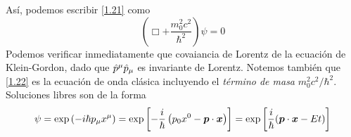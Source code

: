 Así, podemos escribir \eqref{1.21} como
\begin{equation}\label{1.22}
  \left(\Box+\frac{m_0^2c^2}{\hbar^2}\right)\psi=0
\end{equation}
Podemos verificar inmediatamente que covaiancia de Lorentz de la ecuación de Klein-Gordon, dado que $ \hat{p}^\mu \hat{p}_\mu$ es invariante de Lorentz. Notemos también que \eqref{1.22} es la ecuación de onda clásica incluyendo el \textit{término de masa} $m_0^2c^2/\hbar^2$. Soluciones libres son de la forma
\begin{equation}
  \psi=\exp\left(-i\hbar p_\mu x^\mu \right)=\exp\left[-\frac{i}{\hbar}\left(p_0x^0-\vb*{p}\cdot\vb*{x}\right)\right]=\exp\left[\frac{i}{\hbar}(\vb*{p}\cdot\vb*{x}-Et)\right]
\end{equation}







































